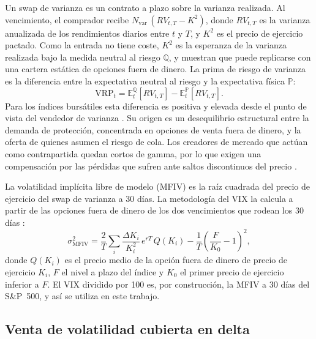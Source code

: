 \documentclass[11pt,a4paper]{article}
\newcommand{\E}{\mathbb{E}}
\begin{document}
Un swap de varianza es un contrato a plazo sobre la varianza realizada. Al vencimiento, el comprador recibe $N_{\text{var}}\,(RV_{t,T}-K^2)$, donde $RV_{t,T}$ es la varianza anualizada de los rendimientos diarios entre $t$ y $T$, y $K^2$ es el precio de ejercicio pactado. Como la entrada no tiene coste, $K^2$ es la esperanza de la varianza realizada bajo la medida neutral al riesgo $\mathbb{Q}$, y \citet{carrwu2009} muestran que puede replicarse con una cartera estática de opciones fuera de dinero. La prima de riesgo de varianza es la diferencia entre la expectativa neutral al riesgo y la expectativa física $\mathbb{P}$:
\begin{equation}
  \text{VRP}_t = \E^{\mathbb{Q}}_t[RV_{t,T}] - \E^{\mathbb{P}}_t[RV_{t,T}].
\end{equation}
Para los índices bursátiles esta diferencia es positiva y elevada desde el punto de vista del vendedor de varianza \citep{carrwu2009}. Su origen es un desequilibrio estructural entre la demanda de protección, concentrada en opciones de venta fuera de dinero, y la oferta de quienes asumen el riesgo de cola. Los creadores de mercado que actúan como contrapartida quedan cortos de gamma, por lo que exigen una compensación por las pérdidas que sufren ante saltos discontinuos del precio \citep{ang2018,israelov2019}.

La volatilidad implícita libre de modelo (MFIV) es la raíz cuadrada del precio de ejercicio del swap de varianza a 30 días. La metodología del VIX la calcula a partir de las opciones fuera de dinero de los dos vencimientos que rodean los 30 días \citep{cboe2019}:
\begin{equation}\label{eq:mfiv}
  \sigma^2_{\text{MFIV}} = \frac{2}{T}\sum_i \frac{\Delta K_i}{K_i^2}\,e^{rT}\,Q(K_i) - \frac{1}{T}\left(\frac{F}{K_0}-1\right)^2,
\end{equation}
donde $Q(K_i)$ es el precio medio de la opción fuera de dinero de precio de ejercicio $K_i$, $F$ el nivel a plazo del índice y $K_0$ el primer precio de ejercicio inferior a $F$. El VIX dividido por 100 es, por construcción, la MFIV a 30 días del S\&P~500, y así se utiliza en este trabajo.

\subsection{Venta de volatilidad cubierta en delta}
\end{document}
